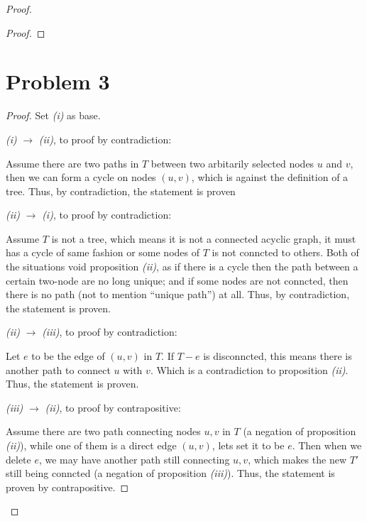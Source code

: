 \documentclass[12pt]{article}
\begin{document}
\begin{proof}
\begin{proof}
\end{proof}


\section{Problem 3}




\begin{proof}

\newline Set \textit{(i)} as base. \newline

\textit{(i)} $\longrightarrow$ \textit{(ii)}, to proof by contradiction:

Assume there are two paths in $T$ between two arbitarily selected nodes $u$ and $v$, then we can form a cycle on nodes $(u, v)$, which is against the definition of a tree. Thus, by contradiction, the statement is proven \newline

\textit{(ii)} $\longrightarrow$ \textit{(i)}, to proof by contradiction:

Assume $T$ is not a tree, which means it is not a connected acyclic graph, it must has a cycle of same fashion or some nodes of $T$ is not conncted to others. Both of the situations void proposition \textit{(ii)}, as if there is a cycle then the path between a certain two-node are no long unique; and if some nodes are not conncted, then there is no path (not to mention ``unique path'') at all. Thus, by contradiction, the statement is proven. \newline

\textit{(ii)} $\longrightarrow$ \textit{(iii)}, to proof by contradiction:

Let $e$ to be the edge of $(u, v)$ in $T$. If $T-e$ is disconncted, this means there is another path to connect $u$ with $v$. Which is a contradiction to proposition \textit{(ii)}. Thus, the statement is proven. \newline

\textit{(iii)} $\longrightarrow$ \textit{(ii)}, to proof by contrapositive:

Assume there are two path connecting nodes $u, v$ in $T$ (a negation of proposition \textit{(ii)}), while one of them is a direct edge $(u, v)$, lets set it to be $e$. Then when we delete $e$, we may have another path still connecting $u, v$, which makes the new $T'$ still being conncted (a negation of proposition \textit{(iii)}). Thus, the statement is proven by contrapositive. \newline


\end{proof}
\end{proof}
\end{document}
